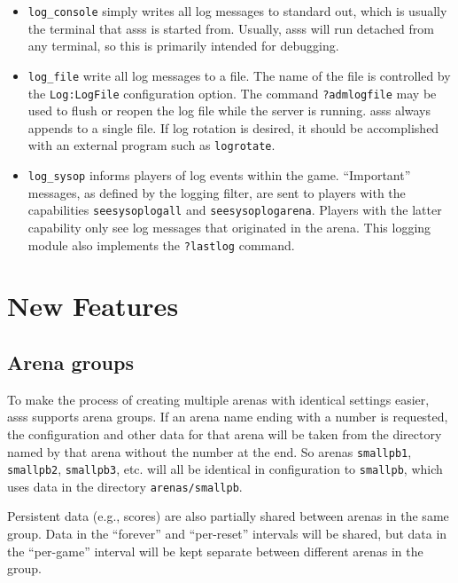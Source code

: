 \documentclass{article}
\newcommand{\asss}{asss}
\begin{document}
\begin{itemize}

\item{\verb/log_console/} simply writes all log messages to standard
out, which is usually the terminal that \asss{} is started from.
Usually, \asss{} will run detached from any terminal, so this is
primarily intended for debugging.

\item{\verb/log_file/} write all log messages to a file. The name of the
file is controlled by the \verb/Log:LogFile/ configuration option. The
command \verb/?admlogfile/ may be used to flush or reopen the log file
while the server is running. \asss{} always appends to a single file. If
log rotation is desired, it should be accomplished with an external
program such as \verb/logrotate/.

\item{\verb/log_sysop/} informs players of log events within the game.
``Important'' messages, as defined by the logging filter, are sent to
players with the capabilities \verb/seesysoplogall/ and
\verb/seesysoplogarena/. Players with the latter capability only see log
messages that originated in the arena. This logging module also
implements the \verb/?lastlog/ command.

\end{itemize}


\section{New Features}

\subsection{Arena groups}

To make the process of creating multiple arenas with identical settings
easier, \asss{} supports arena groups. If an arena name ending with a
number is requested, the configuration and other data for that arena
will be taken from the directory named by that arena without the number
at the end. So arenas \verb/smallpb1/, \verb/smallpb2/, \verb/smallpb3/,
etc. will all be identical in configuration to \verb/smallpb/, which
uses data in the directory \verb|arenas/smallpb|.

Persistent data (e.g., scores) are also partially shared between arenas
in the same group. Data in the ``forever'' and ``per-reset'' intervals
will be shared, but data in the ``per-game'' interval will be kept
separate between different arenas in the group.
\end{document}
